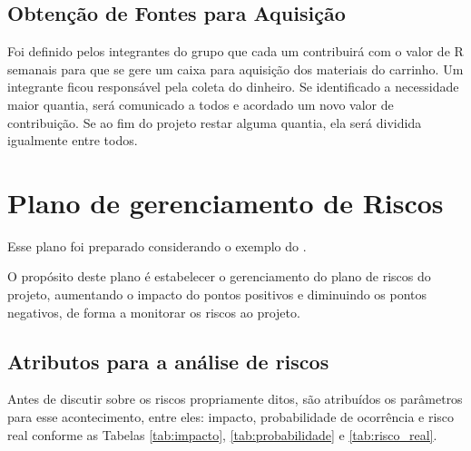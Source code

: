 \subsection{Obtenção de Fontes para Aquisição}
Foi definido pelos integrantes do grupo que cada um contribuirá com o valor de R semanais para que se gere um caixa para aquisição dos materiais do carrinho. Um integrante ficou responsável pela coleta do dinheiro. Se identificado a necessidade maior quantia, será comunicado a todos e acordado um novo valor de contribuição. Se ao fim do projeto restar alguma quantia, ela será dividida igualmente entre todos. 



\section{Plano de gerenciamento de Riscos}
Esse plano foi preparado considerando o exemplo do \cite{lappis}.

\par O propósito deste plano é estabelecer o gerenciamento do plano de riscos do projeto, aumentando o impacto do pontos positivos e diminuindo os pontos negativos, de forma a monitorar os riscos ao projeto.

\subsection{Atributos para a análise de riscos}
Antes de discutir sobre os riscos propriamente ditos, são atribuídos os parâmetros para esse acontecimento, entre eles: impacto, probabilidade de ocorrência e risco real conforme as Tabelas \ref{tab:impacto}, \ref{tab:probabilidade} e \ref{tab:risco_real}.

